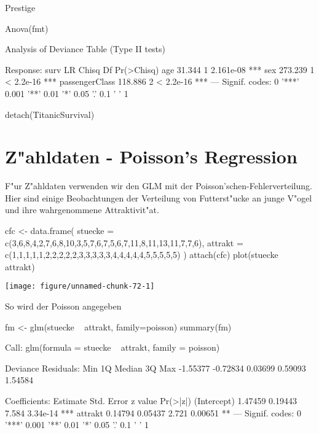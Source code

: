 \documentclass[a4paper,twoside]{tufte-book}\usepackage[]{graphicx}\usepackage[]{color}
\makeatletter
\def\maxwidth{ %
  \ifdim\Gin@nat@width>\linewidth
    \linewidth
  \else
    \Gin@nat@width
  \fi
}
\makeatother
\begin{document}
\begin{appendices}
\begin{Schunk}
\begin{Soutput}
    Prestige
\end{Soutput}
\begin{Sinput}
Anova(fmt)
\end{Sinput}
\begin{Soutput}
Analysis of Deviance Table (Type II tests)

Response: surv
               LR Chisq Df Pr(>Chisq)    
age              31.344  1  2.161e-08 ***
sex             273.239  1  < 2.2e-16 ***
passengerClass  118.886  2  < 2.2e-16 ***
---
Signif. codes:  0 '***' 0.001 '**' 0.01 '*' 0.05 '.' 0.1 ' ' 1
\end{Soutput}
\begin{Sinput}
detach(TitanicSurvival)
\end{Sinput}
\end{Schunk}

\section{Z"ahldaten - Poisson's Regression}

F"ur Z"ahldaten verwenden wir den GLM mit der Poisson'schen-Fehlerverteilung. Hier sind einige Beobachtungen der Verteilung von Futterst"ucke an junge V"ogel und ihre wahrgenommene Attraktivit"at.

\begin{Schunk}
\begin{Sinput}
cfc <- data.frame(
  stuecke = c(3,6,8,4,2,7,6,8,10,3,5,7,6,7,5,6,7,11,8,11,13,11,7,7,6),
  attrakt = c(1,1,1,1,1,2,2,2,2,2,3,3,3,3,3,4,4,4,4,4,5,5,5,5,5) 
)
attach(cfc)
plot(stuecke ~ attrakt)
\end{Sinput}

\texttt{[image: figure/unnamed-chunk-72-1]} \end{Schunk}

So wird der Poisson angegeben

\begin{Schunk}
\begin{Sinput}
fm <- glm(stuecke ~ attrakt, family=poisson)
summary(fm)
\end{Sinput}
\begin{Soutput}

Call:
glm(formula = stuecke ~ attrakt, family = poisson)

Deviance Residuals: 
     Min        1Q    Median        3Q       Max  
-1.55377  -0.72834   0.03699   0.59093   1.54584  

Coefficients:
            Estimate Std. Error z value Pr(>|z|)    
(Intercept)  1.47459    0.19443   7.584 3.34e-14 ***
attrakt      0.14794    0.05437   2.721  0.00651 ** 
---
Signif. codes:  0 '***' 0.001 '**' 0.01 '*' 0.05 '.' 0.1 ' ' 1


\end{Soutput}
\end{Schunk}
\end{appendices}
\end{document}
